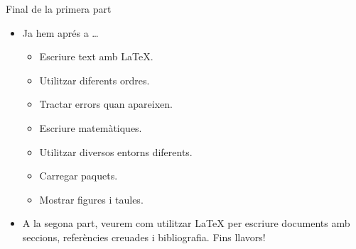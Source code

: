 \begin{frame}{Final de la primera part}
\begin{itemize}
\item Ja hem aprés a \dots 
\begin{itemize}
\item Escriure text amb \LaTeX.
\item Utilitzar diferents ordres.
\item Tractar errors quan apareixen. 
\item Escriure matemàtiques. 
\item Utilitzar diversos entorns diferents.
\item Carregar paquets.
\item Mostrar figures i taules.
\end{itemize}
\item A la segona part, veurem com utilitzar \LaTeX{} per escriure documents amb seccions, referències creuades i bibliografia. Fins llavors!
\end{itemize}
\end{frame}


